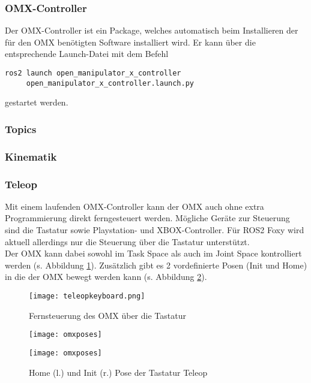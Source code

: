 \subsubsection{OMX-Controller}
Der OMX-Controller ist ein Package, welches automatisch beim Installieren der für den OMX benötigten Software installiert wird. Er kann über die entsprechende Launch-Datei mit dem Befehl
\begin{verbatim}
ros2 launch open_manipulator_x_controller 
     open_manipulator_x_controller.launch.py
\end{verbatim}
gestartet werden.



\subsubsection{Topics}



\subsubsection{Kinematik}


\subsubsection{Teleop} \label{teleop}
Mit einem laufenden OMX-Controller kann der OMX auch ohne extra Programmierung direkt ferngesteuert werden. Mögliche Geräte zur Steuerung sind die Tastatur sowie Playstation- und XBOX-Controller. Für \ac{ROS2} Foxy wird aktuell allerdings nur die Steuerung über die Tastatur unterstützt.\\
Der OMX kann dabei sowohl im Task Space als auch im Joint Space kontrolliert werden (s. Abbildung \ref{fig:teleopkeyboard}). Zusätzlich gibt es 2 vordefinierte Posen (Init und Home) in die der OMX bewegt werden kann (s. Abbildung \ref{fig:teleopposes}).
\begin{figure}[ht!]
\centering
\texttt{[image: teleopkeyboard.png]}
\caption{Fernsteuerung des OMX über die Tastatur}
\label{fig:teleopkeyboard}
\end{figure}
\begin{figure}[htb]
    \centering
    \begin{minipage}[t]{0.45\linewidth}
        \centering
        \texttt{[image: omxposes]}
    \end{minipage}%
    \hfill
    \begin{minipage}[t]{0.45\linewidth}
        \centering
        \texttt{[image: omxposes]}
    \end{minipage}
    \caption{Home (l.) und Init (r.) Pose der Tastatur Teleop}
    \label{fig:teleopposes}
\end{figure}



